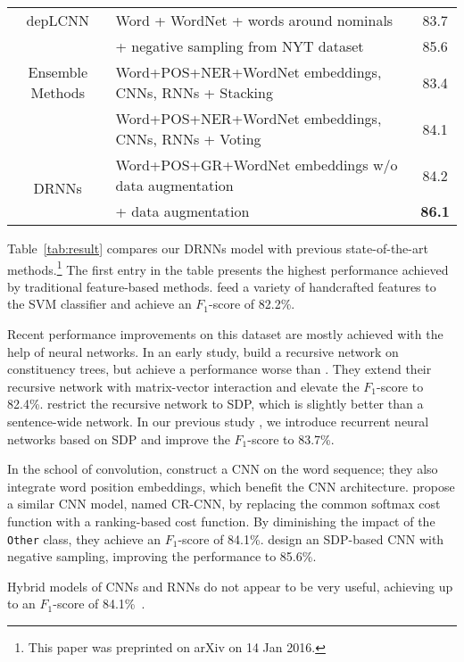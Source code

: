 \documentclass[11pt]{article}
\begin{document}
\begin{table*}[!t]
{\begin{tabular}{c|l|c}
\hline
depLCNN & Word + WordNet + words around nominals & 83.7\\
\footnotesize\cite{CNN-NG}     & + negative sampling from NYT dataset & 85.6\\
\hline
Ensemble Methods & Word+POS+NER+WordNet embeddings, CNNs, RNNs + Stacking &  83.4 \\
\footnotesize\cite{EnsembleNN}   & Word+POS+NER+WordNet embeddings, CNNs, RNNs + Voting   & 84.1\\
\hline
\multirow{2}{*}{DRNNs}          & Word+POS+GR+WordNet embeddings w/o data augmentation                                          & 84.2\\
    & + data augmentation      &\textbf{86.1}\\
\hline
\hline
\end{tabular}
}
\caption{Comparison of previous relation classification systems.}
\label{tab:result}
\end{table*}
Table~\ref{tab:result} compares our DRNNs model with previous state-of-the-art methods.\footnote{This paper was preprinted on arXiv on 14 Jan 2016.}
The first entry in the table presents the highest performance achieved by traditional feature-based methods.
 feed a variety of handcrafted features to the SVM classifier and achieve an $F_1$-score of 82.2\%.


Recent performance improvements on this dataset are mostly achieved with the help of neural networks.
In an early study,  build a recursive network on constituency trees, but achieve a performance worse than .
They extend their recursive network with matrix-vector interaction and elevate the $F_1$-score to 82.4\%.
 restrict the recursive network to SDP, which is slightly better than a sentence-wide network.
In our previous study \cite{SDP-LSTM}, we introduce recurrent neural networks based on SDP and improve the $F_1$-score to 83.7\%.

In the school of convolution,  construct a CNN on the word sequence; they also integrate word position embeddings, which benefit the CNN architecture.
 propose a similar CNN model, named CR-CNN, by replacing the common softmax cost function with a ranking-based cost function.
By diminishing the impact of the \verb|Other| class, they achieve an $F_1$-score of 84.1\%.
 design an SDP-based CNN with negative sampling, improving the performance to 85.6\%.

Hybrid models of CNNs and RNNs do not appear to be very useful, achieving up to an $F_1$-score of 84.1\%~\cite{DepNN,EnsembleNN}.
\end{document}
